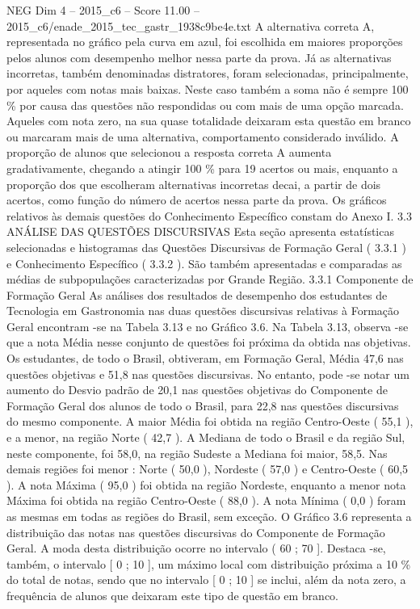 \begin{textsample}{NEG Dim 4 – 2015\_c6 – Score 11.00 – 2015\_c6/enade\_2015\_tec\_gastr\_1938c9be4e.txt}
A alternativa correta A, representada no gráfico pela curva em azul, foi escolhida em maiores proporções pelos alunos com desempenho melhor nessa parte da prova.
Já as alternativas incorretas, também denominadas distratores, foram selecionadas, principalmente, por aqueles com notas mais baixas.
Neste caso também a soma não é sempre 100 \% por causa das questões não respondidas ou com mais de uma opção marcada.
Aqueles com nota zero, na sua quase totalidade deixaram esta questão em branco ou marcaram mais de uma alternativa, comportamento considerado inválido.
A proporção de alunos que selecionou a resposta correta A aumenta gradativamente, chegando a atingir 100 \% para 19 acertos ou mais, enquanto a proporção dos que escolheram alternativas incorretas decai, a partir de dois acertos, como função do número de acertos nessa parte da prova.
Os gráficos relativos às demais questões do Conhecimento Específico constam do Anexo I. 3.3 ANÁLISE DAS QUESTÕES DISCURSIVAS Esta seção apresenta estatísticas selecionadas e histogramas das Questões Discursivas de Formação Geral ( 3.3.1 ) e Conhecimento Específico ( 3.3.2 ).
São também apresentadas e comparadas as médias de subpopulações caracterizadas por Grande Região. 3.3.1 Componente de Formação Geral As análises dos resultados de desempenho dos estudantes de Tecnologia em Gastronomia nas duas questões discursivas relativas à Formação Geral encontram -se na Tabela 3.13 e no Gráfico 3.6.
Na Tabela 3.13, observa -se que a nota Média nesse conjunto de questões foi próxima da obtida nas objetivas.
Os estudantes, de todo o Brasil, obtiveram, em Formação Geral, Média 47,6 nas questões objetivas e 51,8 nas questões discursivas.
No entanto, pode -se notar um aumento do Desvio padrão de 20,1 nas questões objetivas do Componente de Formação Geral dos alunos de todo o Brasil, para 22,8 nas questões discursivas do mesmo componente.
A maior Média foi obtida na região Centro-Oeste ( 55,1 ), e a menor, na região Norte ( 42,7 ).
A Mediana de todo o Brasil e da região Sul, neste componente, foi 58,0, na região Sudeste a Mediana foi maior, 58,5.
Nas demais regiões foi menor : Norte ( 50,0 ), Nordeste ( 57,0 ) e Centro-Oeste ( 60,5 ).
A nota Máxima ( 95,0 ) foi obtida na região Nordeste, enquanto a menor nota Máxima foi obtida na região Centro-Oeste ( 88,0 ).
A nota Mínima ( 0,0 ) foram as mesmas em todas as regiões do Brasil, sem exceção.
O Gráfico 3.6 representa a distribuição das notas nas questões discursivas do Componente de Formação Geral.
A moda desta distribuição ocorre no intervalo ( 60 ; 70 ].
Destaca -se, também, o intervalo [ 0 ; 10 ], um máximo local com distribuição próxima a 10 \% do total de notas, sendo que no intervalo [ 0 ; 10 ] se inclui, além da nota zero, a frequência de alunos que deixaram este tipo de questão em branco.

\end{textsample}
